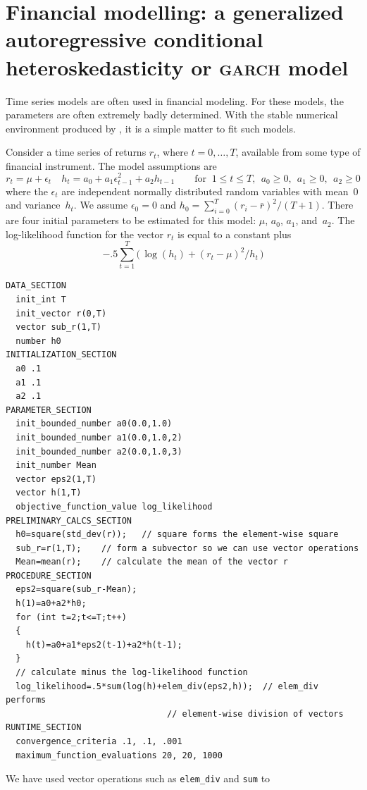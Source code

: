 \documentclass{admbmanual}
\begin{document}
\section{Financial modelling: a generalized autoregressive\br
  conditional \hbox{heteroskedasticity} or \textsc{garch} model}

Time series models are often used in financial modeling. For these models, the
parameters are often extremely badly determined. With the stable numerical
environment produced by \ADM, it is a simple matter to fit such models.

Consider a time series of returns $r_t$, where $t=0,\ldots,T$, available from
some type of financial instrument. The model assumptions are
    $$ r_t = \mu + \epsilon_t\quad
        h_t = a_0 + a_1\epsilon_{t-1}^2 + a_2h_{t-1}\qquad
\textrm{for }\ 1\le t\le T,\ \ a_0\ge 0,\ \ a_1\ge 0,\ \ a_2\ge 0$$
where the $\epsilon_t$ are independent normally distributed random variables
with mean~0 and variance~$h_t$. We assume $\epsilon_0=0$ and $h_0 =
\sum_{i=0}^T(r_i-\bar r)^2/(T+1)$. There are four initial parameters to be
estimated for this model: $\mu$, $a_0$, $a_1$, and~$a_2$. The log-likelihood
function for the vector $r_t$ is equal to a constant plus
$$-.5\sum_{t=1}^T\big(\,\log(h_t)+(r_t-\mu)^2/h_t\,\big)$$
\begin{lstlisting}
DATA_SECTION
  init_int T
  init_vector r(0,T)
  vector sub_r(1,T)
  number h0
INITIALIZATION_SECTION
  a0 .1
  a1 .1
  a2 .1
PARAMETER_SECTION
  init_bounded_number a0(0.0,1.0)
  init_bounded_number a1(0.0,1.0,2)
  init_bounded_number a2(0.0,1.0,3)
  init_number Mean
  vector eps2(1,T)
  vector h(1,T)
  objective_function_value log_likelihood
PRELIMINARY_CALCS_SECTION
  h0=square(std_dev(r));   // square forms the element-wise square
  sub_r=r(1,T);    // form a subvector so we can use vector operations
  Mean=mean(r);    // calculate the mean of the vector r
PROCEDURE_SECTION
  eps2=square(sub_r-Mean);
  h(1)=a0+a2*h0;
  for (int t=2;t<=T;t++)
  {
    h(t)=a0+a1*eps2(t-1)+a2*h(t-1);
  }
  // calculate minus the log-likelihood function
  log_likelihood=.5*sum(log(h)+elem_div(eps2,h));  // elem_div performs
                                // element-wise division of vectors
RUNTIME_SECTION
  convergence_criteria .1, .1, .001
  maximum_function_evaluations 20, 20, 1000
\end{lstlisting}
We have used vector operations such as \texttt{elem\_div} and \texttt{sum} to
\end{document}
